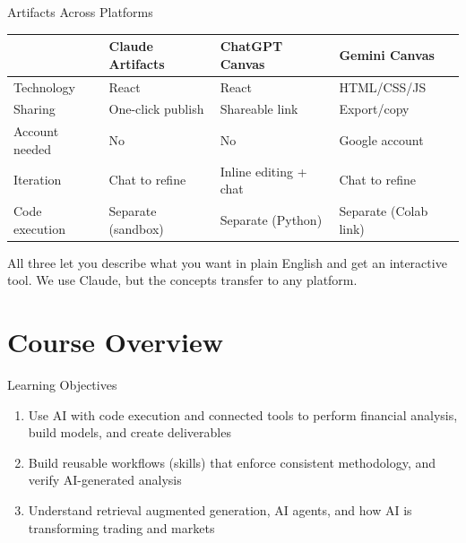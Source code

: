 \documentclass[aspectratio=169]{beamer}
\begin{document}
\begin{frame}{Artifacts Across Platforms}

\begin{center}\small
\begin{tabular}{@{} l l l l @{}}
\toprule
& \textbf{Claude Artifacts} & \textbf{ChatGPT Canvas} & \textbf{Gemini Canvas} \\
\midrule
Technology & React & React & HTML/CSS/JS \\
Sharing & One-click publish & Shareable link & Export/copy \\
Account needed & No & No & Google account \\
Iteration & Chat to refine & Inline editing + chat & Chat to refine \\
Code execution & Separate (sandbox) & Separate (Python) & Separate (Colab link) \\
\bottomrule
\end{tabular}
\end{center}

\vspace{0.3cm}
All three let you describe what you want in plain English and get an interactive tool.  We use Claude, but the concepts transfer to any platform.
\end{frame}

\section{Course Overview}

\begin{frame}{Learning Objectives}
\begin{enumerate}
\item Use AI with code execution and connected tools to perform financial analysis, build models, and create deliverables
\item Build reusable workflows (skills) that enforce consistent methodology, and verify AI-generated analysis
\item Understand retrieval augmented generation, AI agents, and how AI is transforming trading and markets
\end{enumerate}
\end{frame}
\end{document}
